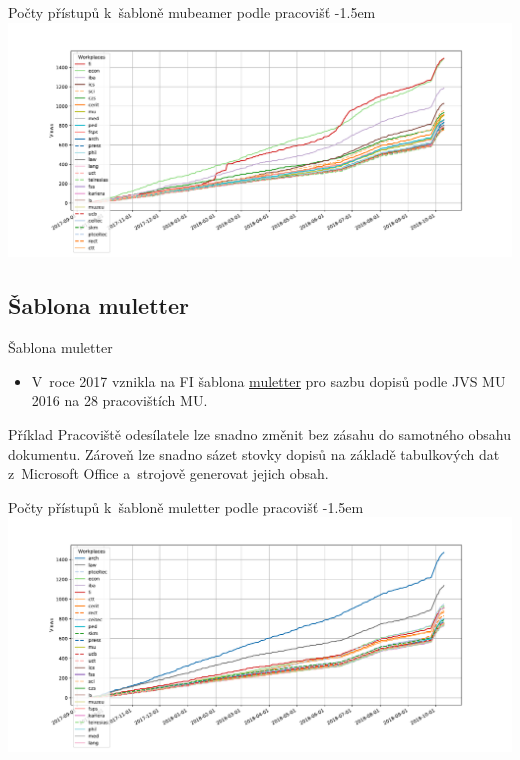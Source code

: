 \documentclass[
  aspectratio=169,
]{beamer}
\makeatletter
\newcommand\odkaz[2]{\textcolor{mubeamer@base}{\uline{\href{#1}{#2}}}}
\makeatother
\begin{document}
\begin{frame}{Počty přístupů k~šabloně mubeamer podle pracovišť}
\kern-1.5em\leavevmode\relax
\includegraphics[width=\textwidth]{figs/mubeamer}
\end{frame}

\subsection{Šablona muletter}

\begin{frame}{Šablona muletter}
\begin{itemize}
\item V~roce 2017 vznikla na FI \alert{šablona \odkaz{https://www.fi.muni.cz/lemma/projekty/muletter/}{muletter} pro sazbu dopisů podle JVS MU 2016 na 28 pracovištích MU}.
\end{itemize}

\begin{block}{Příklad}
Pracoviště odesílatele lze snadno změnit bez zásahu do samotného obsahu dokumentu. Zároveň lze snadno sázet stovky dopisů na základě tabulkových dat z~Microsoft Office a~strojově generovat jejich obsah.
\end{block}
\end{frame}

\begin{frame}{Počty přístupů k~šabloně muletter podle pracovišť}
\kern-1.5em\leavevmode\relax
\includegraphics[width=\textwidth]{figs/muletter}
\end{frame}
\end{document}
